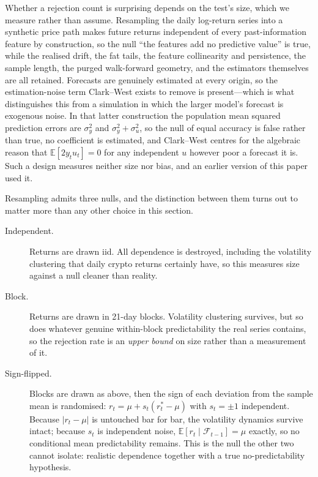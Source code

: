 \documentclass{article}
\theoremstyle{plain}
\theoremstyle{definition}
\begin{document}
Whether a rejection count is surprising depends on the test's size, which we
measure rather than assume. Resampling the daily log-return series into a synthetic
price path makes future returns independent of every past-information feature by
construction, so the null ``the features add no predictive value'' is true, while
the realised drift, the fat tails, the feature collinearity and persistence, the
sample length, the purged walk-forward geometry, and the estimators themselves are
all retained. Forecasts are genuinely estimated at every origin, so the
estimation-noise term Clark--West exists to remove is present---which is what
distinguishes this from a simulation in which the larger model's forecast is
exogenous noise. In that latter construction the population mean squared prediction
errors are $\sigma_y^2$ and $\sigma_y^2 + \sigma_u^2$, so the null of equal
accuracy is false rather than true, no coefficient is estimated, and Clark--West
centres for the algebraic reason that $\mathbb{E}[2 y_t u_t] = 0$ for any
independent $u$ however poor a forecast it is. Such a design measures neither
size nor bias, and an earlier version of this paper used it.

Resampling admits three nulls, and the distinction between them turns out to matter
more than any other choice in this section.

\begin{description}
  \item[Independent.] Returns are drawn iid. All dependence is destroyed, including
    the volatility clustering that daily crypto returns certainly have, so this
    measures size against a null cleaner than reality.
  \item[Block.] Returns are drawn in 21-day blocks. Volatility clustering survives,
    but so does whatever genuine within-block predictability the real series
    contains, so the rejection rate is an \emph{upper bound} on size rather than a
    measurement of it.
  \item[Sign-flipped.] Blocks are drawn as above, then the sign of each deviation
    from the sample mean is randomised: $r_t = \mu + s_t (r^{\ast}_t - \mu)$ with
    $s_t = \pm 1$ independent. Because $|r_t - \mu|$ is untouched bar for bar, the
    volatility dynamics survive intact; because $s_t$ is independent noise,
    $\mathbb{E}[r_t \mid \mathcal{F}_{t-1}] = \mu$ exactly, so no conditional mean
    predictability remains. This is the null the other two cannot isolate: realistic
    dependence together with a true no-predictability hypothesis.
\end{description}
\end{document}
